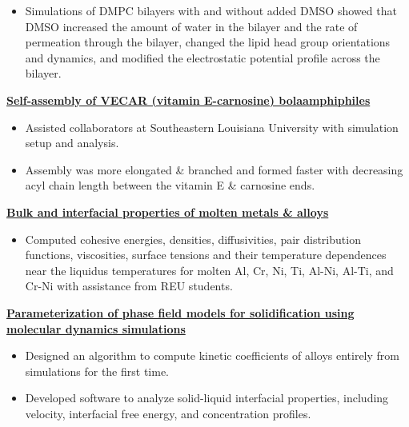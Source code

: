\begin{cventries}
{\begin{cvitems}
                \vspace{2pt}
                \begin{itemize}
                    \item Simulations of DMPC bilayers with and without added DMSO showed that DMSO increased the amount of water in the bilayer and the rate of permeation through the bilayer, changed the lipid head group orientations and dynamics, and modified the electrostatic potential profile across the bilayer.
                \end{itemize}
            \item {\textbf{\underline{Self-assembly of VECAR (vitamin E-carnosine) bolaamphiphiles}}}
                \vspace{2pt}
                \begin{itemize}
                \item {Assisted collaborators at Southeastern Louisiana University with simulation setup and analysis.}
                \item{Assembly was more elongated \& branched and formed faster with decreasing acyl chain length between the vitamin E \& carnosine ends.}
                \end{itemize}
            \item {\textbf{\underline{Bulk and interfacial properties of molten metals \& alloys}}}
                \vspace{2pt}
                \begin{itemize}
                    \item Computed cohesive energies, densities, diffusivities, pair distribution functions, viscosities, surface tensions and their temperature dependences near the liquidus temperatures for molten Al, Cr, Ni, Ti, Al-Ni, Al-Ti, and Cr-Ni with assistance from REU students.
                \end{itemize}
            \item {\textbf{\underline{Parameterization of phase field models for solidification using molecular dynamics simulations}}}
                \vspace{2pt}
                \begin{itemize}
                    \item {Designed an algorithm to compute kinetic coefficients of alloys entirely from simulations for the first time.}
                    \item {Developed software to analyze solid-liquid interfacial properties, including velocity, interfacial free energy, and concentration profiles.}

\end{itemize}
\end{cvitems}}
\end{cventries}
